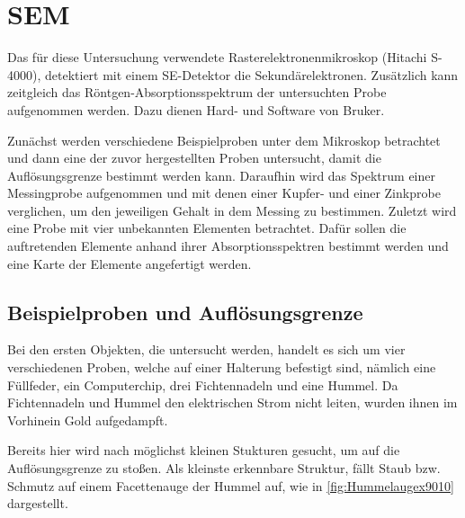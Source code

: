 \section{SEM}

	Das für diese Untersuchung verwendete Rasterelektronenmikroskop (Hitachi S-4000), detektiert mit einem SE-Detektor die Sekundärelektronen.
	Zusätzlich kann zeitgleich das Röntgen-Absorptionsspektrum der untersuchten Probe aufgenommen werden.
	Dazu dienen Hard- und Software von Bruker\cite{bruker}.

	Zunächst werden verschiedene Beispielproben unter dem Mikroskop betrachtet und dann eine der zuvor hergestellten Proben untersucht, damit die Auflösungsgrenze bestimmt werden kann.
	Daraufhin wird das Spektrum einer Messingprobe aufgenommen und mit denen einer Kupfer- und einer Zinkprobe verglichen, um den jeweiligen Gehalt in dem Messing zu bestimmen.
	Zuletzt wird eine Probe mit vier unbekannten Elementen betrachtet.
	Dafür sollen die auftretenden Elemente anhand ihrer Absorptionsspektren bestimmt werden und eine Karte der Elemente angefertigt werden.

\subsection{Beispielproben und Auflösungsgrenze} %

	Bei den ersten Objekten, die untersucht werden, handelt es sich um vier verschiedenen Proben, welche auf einer Halterung befestigt sind, nämlich eine Füllfeder, ein Computerchip, drei Fichtennadeln und eine Hummel.
	Da Fichtennadeln und Hummel den elektrischen Strom nicht leiten, wurden ihnen im Vorhinein Gold aufgedampft.

	Bereits hier wird nach möglichst kleinen Stukturen gesucht, um auf die Auflösungsgrenze zu stoßen.
	Als kleinste erkennbare Struktur, fällt Staub bzw. Schmutz auf einem Facettenauge der Hummel auf, wie in \cref{fig:Hummelaugex9010} dargestellt.

